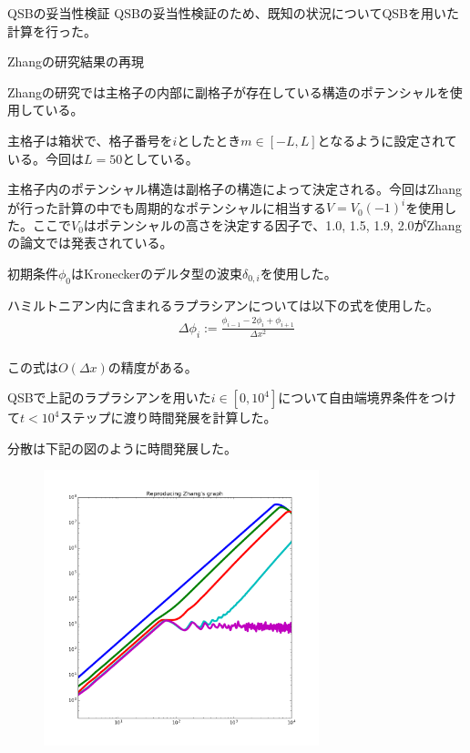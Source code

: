 \documentclass[a4paper, lualatex]{bxjsarticle}
\begin{document}
\newpage
\begin{section}{QSBの妥当性検証}
    QSBの妥当性検証のため、既知の状況についてQSBを用いた計算を行った。
    \begin{subsection}{Zhangの研究結果の再現}
        \par Zhangの研究では主格子の内部に副格子が存在している構造のポテンシャルを使用している。
        \par 主格子は箱状で、格子番号を$i$としたとき$m\in [-L, L]$となるように設定されている。今回は$L=50$としている。
        \par 主格子内のポテンシャル構造は副格子の構造によって決定される。今回はZhangが行った計算の中でも周期的なポテンシャルに相当する$V=V_0 (-1)^i$を使用した。ここで$V_0$はポテンシャルの高さを決定する因子で、1.0, 1.5, 1.9, 2.0がZhangの論文では発表されている。
        \par 初期条件$\phi_0$はKroneckerのデルタ型の波束$\delta_{0,i}$を使用した。
        \par ハミルトニアン内に含まれるラプラシアンについては以下の式を使用した。
        \begin{align}
         \Delta \phi_i := \frac{\phi_{i-1} - 2\phi_{i} + \phi_{i+1}}{\varDelta x^2}\nonumber\\
        \end{align}
        \par この式は$O(\varDelta x)$の精度がある\cite{Carnahan}。
        \par QSBで上記のラプラシアンを用いた$i\in [0, 10^4]$について自由端境界条件をつけて$t<10^4$ステップに渡り時間発展を計算した。
        \par 分散は下記の図のように時間発展した。
         \begin{figure}[h]
            \centering
            \includegraphics[width=8cm]{zhang.png}

\end{figure}
\end{subsection}
\end{section}
\end{document}
